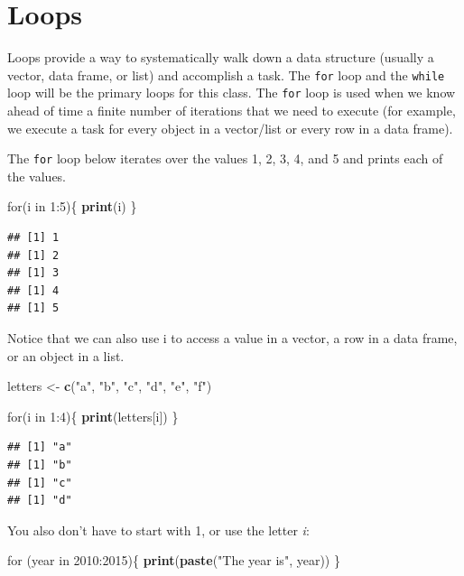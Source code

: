 \documentclass[]{book}
\newenvironment{Shaded}{\begin{snugshade}}{\end{snugshade}}
\newcommand{\KeywordTok}[1]{\textcolor[rgb]{0.13,0.29,0.53}{\textbf{{#1}}}}
\newcommand{\DecValTok}[1]{\textcolor[rgb]{0.00,0.00,0.81}{{#1}}}
\newcommand{\StringTok}[1]{\textcolor[rgb]{0.31,0.60,0.02}{{#1}}}
\newcommand{\NormalTok}[1]{{#1}}
\begin{document}
\section{Loops}\label{loops}

Loops provide a way to systematically walk down a data structure
(usually a vector, data frame, or list) and accomplish a task. The
\texttt{for} loop and the \texttt{while} loop will be the primary loops
for this class. The \texttt{for} loop is used when we know ahead of time
a finite number of iterations that we need to execute (for example, we
execute a task for every object in a vector/list or every row in a data
frame).

The \texttt{for} loop below iterates over the values 1, 2, 3, 4, and 5
and prints each of the values.

\begin{Shaded}
\begin{Highlighting}[]
\NormalTok{for(i in }\DecValTok{1}\NormalTok{:}\DecValTok{5}\NormalTok{)\{}
  \KeywordTok{print}\NormalTok{(i)}
\NormalTok{\}}
\end{Highlighting}
\end{Shaded}

\begin{verbatim}
## [1] 1
## [1] 2
## [1] 3
## [1] 4
## [1] 5
\end{verbatim}

Notice that we can also use i to access a value in a vector, a row in a
data frame, or an object in a list.

\begin{Shaded}
\begin{Highlighting}[]
\NormalTok{letters <-}\StringTok{ }\KeywordTok{c}\NormalTok{(}\StringTok{"a"}\NormalTok{, }\StringTok{"b"}\NormalTok{, }\StringTok{"c"}\NormalTok{, }\StringTok{"d"}\NormalTok{, }\StringTok{"e"}\NormalTok{, }\StringTok{"f"}\NormalTok{)}

\NormalTok{for(i in }\DecValTok{1}\NormalTok{:}\DecValTok{4}\NormalTok{)\{}
  \KeywordTok{print}\NormalTok{(letters[i])}
\NormalTok{\}}
\end{Highlighting}
\end{Shaded}

\begin{verbatim}
## [1] "a"
## [1] "b"
## [1] "c"
## [1] "d"
\end{verbatim}

You also don't have to start with 1, or use the letter \emph{i}:

\begin{Shaded}
\begin{Highlighting}[]
\NormalTok{for (year in }\DecValTok{2010}\NormalTok{:}\DecValTok{2015}\NormalTok{)\{}
  \KeywordTok{print}\NormalTok{(}\KeywordTok{paste}\NormalTok{(}\StringTok{"The year is"}\NormalTok{, year))}
\NormalTok{\}}
\end{Highlighting}
\end{Shaded}
\end{document}

